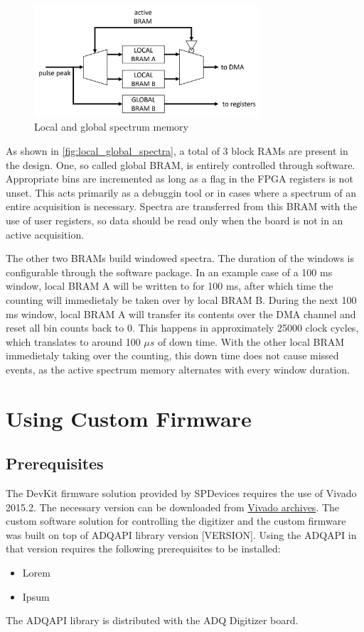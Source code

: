 \documentclass[a4paper,12pt,table]{article}
\begin{document}
\newpage
		\begin{figure}[!ht]
			\centering
			\includegraphics[width=0.75\textwidth]{img/local_global_spectra.png}
			\caption{Local and global spectrum memory}\label{fig:local_global_spectra}
		\end{figure}
		As shown in \autoref{fig:local_global_spectra}, a total of 3 block RAMs are present in the design. 
		One, so called global BRAM, is entirely controlled through software.
		Appropriate bins are incremented as long as a flag in the FPGA registers is not unset.
		This acts primarily as a debuggin tool or in cases where a spectrum of an entire acquisition is necessary.
		Spectra are transferred from this BRAM with the use of user registers,
		so data should be read only when the board is not in an active acquisition.
		\par
		The other two BRAMs build windowed spectra. 
		The duration of the windows is configurable through the software package.
		In an example case of a 100 ms window, local BRAM A will be written to for 100 ms, 
		after which time the counting will immedietaly be taken over by local BRAM B. 
		During the next 100 ms window, local BRAM A will transfer its contents over the DMA channel 
		and reset all bin counts back to 0. This happens in approximately 25000 clock cycles,
		which translates to around 100 $\mu s$ of down time. 
		With the other local BRAM immedietaly taking over the counting, 
		this down time does not cause missed events, 
		as the active spectrum memory alternates with every window duration.
\newpage
\section{Using Custom Firmware}
	\subsection{Prerequisites}
		The DevKit firmware solution provided by SPDevices requires the use of Vivado 2015.2.
		The necessary version can be downloaded from 
		\href{https://www.xilinx.com/support/download/index.html/content/xilinx/en/downloadNav/vivado-design-tools/archive.html}{Vivado archives}.
		The custom software solution for controlling the digitizer and the custom firmware was built on top of
		ADQAPI library version [VERSION]. Using the ADQAPI in that version requires the following prerequisites to be installed:
		\begin{itemize}
			\item Lorem
			\item Ipsum
		\end{itemize}
		The ADQAPI library is distributed with the ADQ Digitizer board. 
\end{document}
